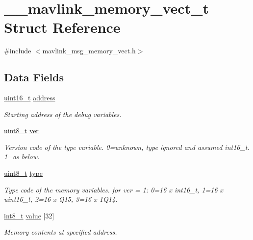 \hypertarget{struct____mavlink__memory__vect__t}{\section{\-\_\-\-\_\-mavlink\-\_\-memory\-\_\-vect\-\_\-t Struct Reference}
\label{struct____mavlink__memory__vect__t}
}


{\ttfamily \#include $<$mavlink\-\_\-msg\-\_\-memory\-\_\-vect.\-h$>$}

\subsection*{Data Fields}
\begin{DoxyCompactItemize}
\item 
\hyperlink{stdint_8h_a273cf69d639a59973b6019625df33e30}{uint16\-\_\-t} \hyperlink{struct____mavlink__memory__vect__t_a079a0cecfd6f6e3d47c4c1d324ddd29d}{address}
\begin{DoxyCompactList}\small\item\em Starting address of the debug variables. \end{DoxyCompactList}\item 
\hyperlink{stdint_8h_aba7bc1797add20fe3efdf37ced1182c5}{uint8\-\_\-t} \hyperlink{struct____mavlink__memory__vect__t_acb180cded1d3dcbf3e719545b50f392e}{ver}
\begin{DoxyCompactList}\small\item\em Version code of the type variable. 0=unknown, type ignored and assumed int16\-\_\-t. 1=as below. \end{DoxyCompactList}\item 
\hyperlink{stdint_8h_aba7bc1797add20fe3efdf37ced1182c5}{uint8\-\_\-t} \hyperlink{struct____mavlink__memory__vect__t_a5c37b4f5d396209693c7bb32097a6e88}{type}
\begin{DoxyCompactList}\small\item\em Type code of the memory variables. for ver = 1\-: 0=16 x int16\-\_\-t, 1=16 x uint16\-\_\-t, 2=16 x Q15, 3=16 x 1\-Q14. \end{DoxyCompactList}\item 
\hyperlink{stdint_8h_ad566f6541e98b74246db1a3a3a85ad49}{int8\-\_\-t} \hyperlink{struct____mavlink__memory__vect__t_a9d2124dfb0efc698eff93eb6744654cf}{value} \mbox{[}32\mbox{]}
\begin{DoxyCompactList}\small\item\em Memory contents at specified address. \end{DoxyCompactList}\end{DoxyCompactItemize}


